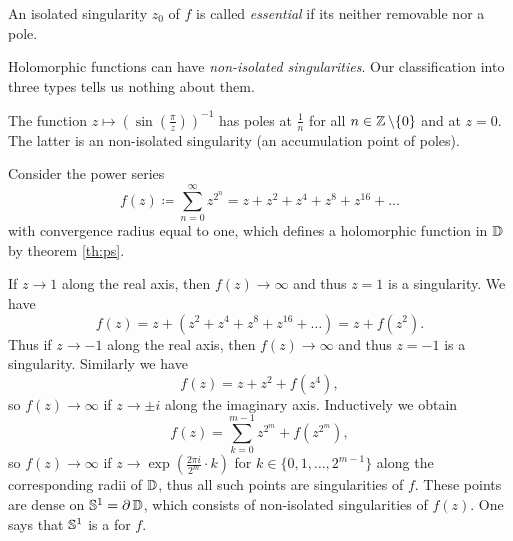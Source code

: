 \documentclass[a4paper,english]{article}
\begin{document}
\begin{defn}
    An isolated singularity $z_0$ of $f$ is called \emph{essential} if its neither removable nor a pole.
\end{defn}

\begin{remarkB}
Holomorphic functions can have \emph{non-isolated singularities}. Our classification into three types tells us nothing about them.
\end{remarkB}

\begin{exampleB}
    The function $z \mapsto \left(\sin\left(\frac{\pi}{z}\right)\right)^{-1}$ has poles at $\frac{1}{n}$ for all $n \in \Z \setminus \{ 0 \}$ and at $z = 0$.
    The latter is an non-isolated singularity (an accumulation point of poles).
\end{exampleB}

\begin{exampleB}
    Consider the power series
    \begin{equation*}
        f(z)
        \coloneqq \sum_{n = 0}^{\infty} z^{2^n}
        = z + z^2 + z^4 + z^8 + z^{16} +\ldots
    \end{equation*}
    with convergence radius equal to one, which defines a holomorphic function in $\D$ by theorem \ref{th:ps}.
    
    If $z \to 1$ along the real axis, then $f(z) \to \infty$ and thus $z = 1$ is a singularity.
    We have
    \begin{equation*}
        f(z)
        = z + \left(z^2 + z^4 + z^8 + z^{16} + \ldots\right)
        = z + f(z^2).
    \end{equation*}
    Thus if $z \to -1$ along the real axis, then $f(z) \to \infty$ and thus $z = -1$ is a singularity.
    Similarly we have
    \begin{equation*}
        f(z) = z + z^2 + f(z^4),
    \end{equation*}
    so $f(z) \to \infty$ if $z \to \pm i$ along the imaginary axis.
    Inductively we obtain
    \begin{equation*}
        f(z)
        = \sum_{k = 0}^{m - 1} z^{2^m} + f(z^{2^m}),
    \end{equation*}
    so $f(z) \to \infty$ if $z \to \exp\left( \frac{2 \pi i}{2^m} \cdot k\right)$ for $k \in \{ 0, 1, \ldots, 2^{m - 1}\}$ along the corresponding radii of $\D$, thus all such points are singularities of $f$.
    These points are dense on $\S^1 = \partial \D$, which consists of non-isolated singularities of $f(z)$.
    One says that $\S^1$ is a  for $f$.
\end{exampleB}
\end{document}
